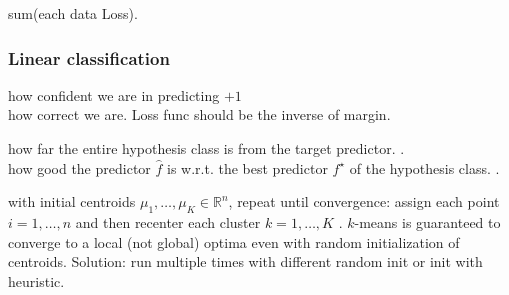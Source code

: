   sum(each data Loss).

\subsubsection{Linear classification}
 how confident we are in predicting $+1$\\
 how correct we are. Loss func should
be the inverse of margin.

 how far the entire hypothesis class is from the target predictor.
.\\
 how good the predictor $\hat{f}$ is w.r.t. the best
predictor $f^\star$ of the hypothesis class.
.

 with initial centroids $\mu_1,\dots,\mu_K \in \mathbb{R}^n$,
repeat until convergence:
assign each point $i=1,\dots,n$ 
and then recenter each cluster $k=1,\dots,K$
.
$k$-means is guaranteed to converge to a local (not global) optima even with
random initialization of centroids. Solution: run multiple times with different
random init or init with heuristic.

